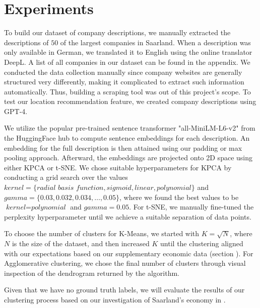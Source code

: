 \documentclass[conference]{IEEEtran}
\begin{document}
\section{Experiments}

To build our dataset of company descriptions, we manually extracted the descriptions of $50$ of the largest companies in Saarland. When a description was only available in German, we translated it to English using the online translator DeepL. A list of all companies in our dataset can be found in the appendix. We conducted the data collection manually since company websites are generally structured very differently, making it complicated to extract such information automatically. Thus, building a scraping tool was out of this project's scope. To test our location recommendation feature, we created company descriptions using GPT-4.

We utilize the popular pre-trained sentence transformer "all-MiniLM-L6-v2" from the HuggingFace hub to compute sentence embeddings for each description. An embedding for the full description is then attained using our padding or max pooling approach.
Afterward, the embeddings are projected onto 2D space using either KPCA or t-SNE. We chose suitable hyperparameters for KPCA by conducting a grid search over the values $\textit{kernel} = \{\textit{radial basis function}, \textit{sigmoid}, \textit{linear}, \textit{polynomial} \}$ and $\textit{gamma} = \{0.03, 0.032, 0.034, \dots, 0.05\}$, where we found the best values to be $\textit{kernel} = \textit{polynomial}$ and $\textit{gamma} = 0.05$. For t-SNE, we manually fine-tuned the perplexity hyperparameter until we achieve a suitable separation of data points.

To choose the number of clusters for K-Means, we started with $K = \sqrt{N}$, where $N$ is the size of the dataset, and then increased $K$ until the clustering aligned with our expectations based on our supplementary economic data (section \MakeUppercase{}). For Agglomerative clustering, we chose the final number of clusters through visual inspection of the dendrogram returned by the algorithm.

Given that we have no ground truth labels, we will evaluate the results of our clustering process based on our investigation of Saarland's economy in \MakeUppercase{}.
\end{document}
